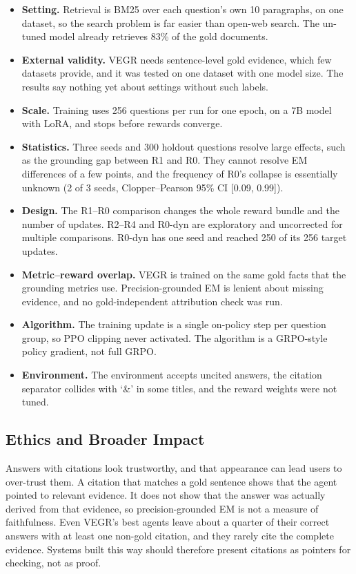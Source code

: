 \begin{itemize}
\tightlist
\item
  \textbf{Setting.} Retrieval is BM25 over each question's own 10
  paragraphs, on one dataset, so the search problem is far easier than
  open-web search. The un-tuned model already retrieves 83\% of the gold
  documents.
\item
  \textbf{External validity.} VEGR needs sentence-level gold evidence,
  which few datasets provide, and it was tested on one dataset with one
  model size. The results say nothing yet about settings without such
  labels.
\item
  \textbf{Scale.} Training uses 256 questions per run for one epoch, on
  a 7B model with LoRA, and stops before rewards converge.
\item
  \textbf{Statistics.} Three seeds and 300 holdout questions resolve
  large effects, such as the grounding gap between R1 and R0. They
  cannot resolve EM differences of a few points, and the frequency of
  R0's collapse is essentially unknown (2 of 3 seeds, Clopper--Pearson
  95\% CI {[}0.09, 0.99{]}).
\item
  \textbf{Design.} The R1--R0 comparison changes the whole reward bundle
  and the number of updates. R2--R4 and R0-dyn are exploratory and
  uncorrected for multiple comparisons. R0-dyn has one seed and reached
  250 of its 256 target updates.
\item
  \textbf{Metric--reward overlap.} VEGR is trained on the same gold
  facts that the grounding metrics use. Precision-grounded EM is lenient
  about missing evidence, and no gold-independent attribution check was
  run.
\item
  \textbf{Algorithm.} The training update is a single on-policy step per
  question group, so PPO clipping never activated. The algorithm is a
  GRPO-style policy gradient, not full GRPO.
\item
  \textbf{Environment.} The environment accepts uncited answers, the
  citation separator collides with `\&' in some titles, and the reward
  weights were not tuned.
\end{itemize}

\subsection{Ethics and Broader Impact}\label{sec:5.4}

Answers with citations look trustworthy, and that appearance can lead
users to over-trust them. A citation that matches a gold sentence shows
that the agent pointed to relevant evidence. It does not show that the
answer was actually derived from that evidence, so precision-grounded EM
is not a measure of faithfulness. Even VEGR's best agents leave about a
quarter of their correct answers with at least one non-gold citation,
and they rarely cite the complete evidence. Systems built this way
should therefore present citations as pointers for checking, not as
proof.

